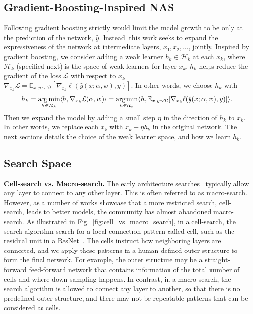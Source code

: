 \subsection{Gradient-Boosting-Inspired NAS}
\label{sec:gb_nas}
Following gradient boosting strictly would limit the model growth to be only at the prediction of the network, $\hat{y}$. 
Instead, this work seeks to expand the expressiveness of the network at intermediate layers, $x_1, x_2,...$, jointly.
Inspired by gradient boosting, we consider adding a weak learner $h_k \in \mathcal{H}_k$ at each $x_k$, where 
$\mathcal{H}_k$ (specified next) is the space of weak learners for layer $x_k$. 
$h_k$ helps reduce the gradient of the loss $\mathcal{L}$ with respect to $x_k$, $\nabla _{x_k} \mathcal{L}  = \mathbb{E} _{x, y \sim \mathcal{D}} [ \nabla _{x_{k}} \ell(\hat{y}(x ; \alpha, w), y) ]$.
In other words, we choose $h_k$ with 
\begin{align}
h_k = \operatorname*{arg\,min} _{h \in \mathcal{H}_k} \langle h, 
\nabla _{x_k} \mathcal{L} (\alpha, w) \rangle = 
\operatorname*{arg\,min} _{h\in \mathcal{H}_k} \langle h, \mathbb{E} _{x, y \sim \mathcal{D}} [ \nabla _{x_{k}} \ell(\hat{y}(x ; \alpha, w), y) ] \rangle.
\label{eq:hallu_objective}
\end{align}
Then we expand the model by adding a small step $\eta$ in the direction of $h_k$ to $x_k$.  In other words, we replace each $x_k$ with $x_k + \eta h_k$ in the original network. 
The next sections details the choice of the weak learner space, and how we learn $h_k$. 

\subsection{Search Space}
\label{sec:search_space}

\textbf{Cell-search vs. Macro-search.}
The early architecture searches~\citep{nas,Real2017EvoNet} typically allow any layer to connect to any other layer. 
This is often referred to as macro-search. 
However, as a number of works \citep{NASCell,Real2018RegularizedEF,Pham2018EfficientNA} showcase that 
a more restricted search, cell-search, leads to better models, the community has almost abandoned macro-search.
As illustrated in Fig.~\ref{fig:cell_vs_macro_search}, in a cell-search, the search algorithm search for a local connection pattern called cell, 
such as the residual unit in a ResNet~\citep{resnet}. The cells instruct how neighboring layers are connected, and 
we apply these patterns in a human defined outer structure to form the final network. 
For example, the outer structure may be a straight-forward feed-forward network that contains 
information of the total number of cells and where down-sampling happens. 
In contrast, in a macro-search, the search algorithm is allowed to connect any layer to another, 
so that there is no predefined outer structure, and there may not be repeatable patterns that can be considered as cells. 

